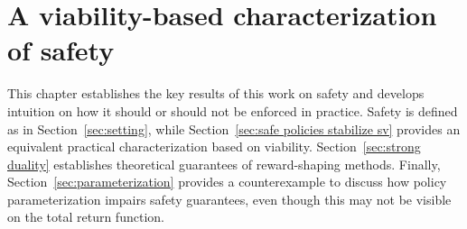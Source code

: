 \chapter{A viability-based characterization of safety} \label{chap:safety from viability}
This chapter establishes the key results of this work on safety and develops intuition on how it should or should not be enforced in practice. Safety is defined as in Section~\ref{sec:setting}, while Section~\ref{sec:safe policies stabilize sv} provides an equivalent practical characterization based on viability. Section~\ref{sec:strong duality} establishes theoretical guarantees of reward-shaping methods. Finally, Section~\ref{sec:parameterization} provides a counterexample to discuss how policy parameterization impairs safety guarantees, even though this may not be visible on the total return function.

